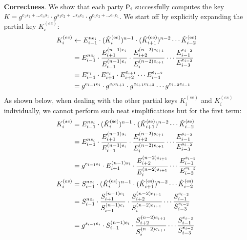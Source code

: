 \textbf{Correctness}. We show that each party $\User[i]$ successfully computes the key $K = g^{e_1s_2 + \dots e_ns_1}\cdot g^{s_1e_2 + \dots s_ne_1}\cdot g^{e_1e_2 + \dots e_ne_1}$.
We start off by explicitly expanding the partial key $K_i^{(ee)}$:
\begin{align*}
	K_i^{(ee)} &\gets E_{i-1}^{n\esk_i} \cdot (\hat{K}_i^\text{(ee)})^{n-1} \cdot (\hat{K}_{i+1}^\text{(ee)})^{n-2} \cdots \hat{K}_{i-2}^\text{(ee)}\\
	&= E_{i-1}^{n\esk_i} \cdot  \dfrac{\epk_{i+1}^{(n-1)\esk_i}}{\epk_{i-1}^{(n-1)\esk_i}} \cdot \dfrac{\epk_{i+2}^{(n-2)\esk_{i+1}}}{\epk_{i}^{(n-2)\esk_{i+1}}} \cdots  \dfrac{\epk_{i-1}^{\esk_{i-2}}}{\epk_{i-3}^{\esk_{i-2}}}  \\
	&= E_{i-1}^{\esk_i} \cdot  \epk_{i+1}^{\esk_i} \cdot \epk_{i+2}^{\esk_{i+1}} \cdots  \epk_{i-1}^{\esk_{i-2}}  \\
	&= g^{\esk_{i-1}\esk_i} \cdot  g^{\esk_i\esk_{i+1}} \cdot g^{\esk_{i+1}\esk_{i+2}} \cdots  g^{\esk_{i-2}\esk_{i-1}}  \\
\end{align*}
As shown below, when dealing with the other partial keys  $K_i^{(se)}$ and $K_i^{(es)}$  individually, we cannot perform such neat simplifications but for the first term:
\begin{align*}
	K_i^{(se)} &= \epk_{i-1}^{n\ssk_i} \cdot (\hat{K}_i^\text{(se)})^{n-1} \cdot (\hat{K}_{i+1}^\text{(se)})^{n-2} \cdots \hat{K}_{i-2}^\text{(se)} \\
	&= \epk_{i-1}^{n\ssk_i} \cdot  \dfrac{\epk_{i+1}^{(n-1)\ssk_i}}{\epk_{i-1}^{(n-1)\ssk_i}} \cdot \dfrac{\epk_{i+2}^{(n-2)\ssk_{i+1}}}{\epk_{i}^{(n-2)\ssk_{i+1}}} \cdots  \dfrac{\epk_{i-1}^{\ssk_{i-2}}}{\epk_{i-3}^{\ssk_{i-2}}}  \\
	&= g^{\esk_{i-1}\ssk_i} \cdot \epk_{i+1}^{(n-1)\ssk_i} \cdot \dfrac{\epk_{i+2}^{(n-2)\ssk_{i+1}}}{\epk_{i}^{(n-2)\ssk_{i+1}}} \cdots  \dfrac{\epk_{i-1}^{\ssk_{i-2}}}{\epk_{i-3}^{\ssk_{i-2}}}  \\
	K_i^{(es)} &= \spk_{i-1}^{n\esk_i} \cdot (\hat{K}_i^\text{(es)})^{n-1} \cdot (\hat{K}_{i+1}^\text{(es)})^{n-2} \cdots \hat{K}_{i-2}^\text{(es)}  \\
	&= \spk_{i-1}^{n\esk_i} \cdot  \dfrac{\spk_{i+1}^{(n-1)\esk_i}}{\spk_{i-1}^{(n-1)\esk_i}} \cdot \dfrac{\spk_{i+2}^{(n-2)\esk_{i+1}}}{\spk_{i}^{(n-2)\esk_{i+1}}} \cdots  \dfrac{\spk_{i-1}^{\esk_{i-2}}}{\spk_{i-3}^{\esk_{i-2}}}  \\
	&= g^{\ssk_{i-1}\esk_i} \cdot \spk_{i+1}^{(n-1)\esk_i} \cdot \dfrac{\spk_{i+2}^{(n-2)\esk_{i+1}}}{\spk_{i}^{(n-2)\esk_{i+1}}} \cdots  \dfrac{\spk_{i-1}^{\esk_{i-2}}}{\spk_{i-3}^{\esk_{i-2}}}  \\
\end{align*}
